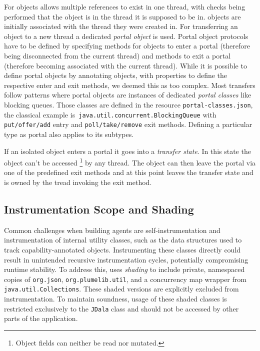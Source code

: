 For \Isolated objects \jdala allows multiple references to exist in one thread, with checks being performed that the object is in the thread it is supposed to be in. \Isolated objects are initially associated with the thread they were created in. For transferring an \Isolated object to a new thread a dedicated \textit{portal object} is used. Portal object protocols have to be defined by specifying methods for objects to enter a portal (therefore being disconnected from the current thread) and methods to exit a portal (therefore becoming associated with the current thread).  While it is possible to define portal objects by annotating objects, with properties to define the respective enter and exit methods, we deemed this  as too complex. Most transfers follow patterns where portal objects are instances of dedicated \textit{portal classes} like blocking queues.  
Those classes are defined in the resource \texttt{portal-classes.json}, the classical example is\texttt{ java.util.concurrent.BlockingQueue} with \texttt{put/\-offer/\-add} entry  and \texttt{poll/\-take/\-remove} exit methods. Defining a particular type as portal also applies to its subtypes. 

If an isolated object enters a portal it goes into a \textit{transfer state}. In this state the object can't be accessed \footnote{Object fields can neither be read nor mutated.} by any thread. The object can then leave the portal via one of the predefined exit methods and at this point leaves the transfer state and is owned by the tread invoking the exit method.


\subsection{Instrumentation Scope and Shading}

Common challenges when building agents are self-instrumentation and instrumentation of internal utility classes, such as the data structures used to track capability-annotated objects. Instrumenting these classes directly could result in unintended recursive instrumentation cycles, potentially compromising runtime stability. To address this, \jdala uses \textit{shading} to include private, namespaced copies of \texttt{org.json}, \texttt{org.plumelib.util}, and a concurrency map wrapper from \texttt{java.util.Collections}. These shaded versions are explicitly excluded from instrumentation. To maintain soundness, usage of these shaded classes is restricted exclusively to the \texttt{JDala} class and should not be accessed by other parts of the application. 

